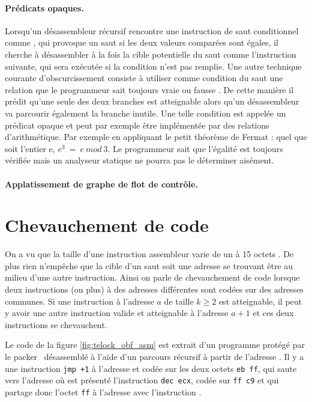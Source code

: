 \paragraph{Prédicats opaques.}
Lorsqu'un désassembleur récursif rencontre une instruction de saut conditionnel comme \je, qui provoque un saut si les deux valeurs comparées sont égales, il cherche à désassembler à la fois la cible potentielle du saut comme l'instruction suivante, qui sera exécutée si la condition n'est pas remplie.
Une autre technique courante d'obscurcissement consiste à utiliser comme condition du saut une relation que le programmeur sait toujours vraie ou fausse \cite{MKK07}. De cette manière il prédit qu'une seule des deux branches est atteignable alors qu'un désassembleur va parcourir également la branche inutile.
Une telle condition est appelée un prédicat opaque et peut par exemple être implémentée par des relations d'arithmétique. Par exemple en appliquant le petit théorème de Fermat \cite{fermat} : quel que soit l'entier e, $e^3\ =\ e\ mod\ 3$.
Le programmeur sait que l'égalité est toujours vérifiée mais un analyseur statique ne pourra pas le déterminer aisément.

\paragraph{Applatissement de graphe de flot de contrôle.}

\section{Chevauchement de code}
On a vu que la taille d'une instruction assembleur varie de un à 15 octets .
De plus rien n'empêche que la cible d'un saut soit une adresse se trouvant être au milieu d'une autre instruction.
Ainsi on parle de chevauchement de code lorsque deux instructions (ou plus) à des adresses différentes sont codées sur des adresses communes. Si une instruction à l'adresse $a$ de taille $k\geq 2$ est atteignable, il peut y avoir une autre instruction valide et atteignable à l'adresse $a+1$ et ces deux instructions se chevauchent.

Le code de la figure \ref{fig:telock_obf_asm} est extrait d'un programme protégé par le packer \telock\ désassemblé à l'aide d'un parcours récursif à partir de l'adresse . Il y a une instruction \texttt{jmp +1} à l'adresse  et codée sur les deux octets \texttt{eb ff}, qui saute vers l'adresse  où est présenté l'instruction \texttt{dec ecx}, codée sur \texttt{ff c9} et qui partage donc l'octet \texttt{ff} à l'adresse  avec l'instruction \jmp.



